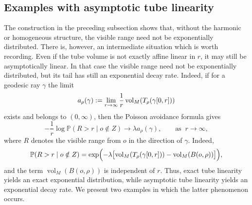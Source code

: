 \documentclass[11pt,a4paper]{article}
\theoremstyle{plain}
\theoremstyle{definition}
\theoremstyle{remark}
\newcommand{\vol}{\mathop{\mathrm{vol}}\nolimits}
\def\PP{\mathbb{P}}
\begin{document}
\subsection{Examples with asymptotic tube linearity}

The construction in the preceding subsection shows that, without the harmonic or homogeneous structure, the visible range need not be exponentially distributed. There is, however, an intermediate situation which is worth recording. Even if the tube volume is not exactly affine linear in \(r\), it may still be asymptotically linear. In that case the visible range need not be exponentially distributed, but its tail has still an exponential decay rate. Indeed, if for a geodesic ray \(\gamma\) the limit
\[
a_\rho(\gamma)
:=
\lim_{r\to\infty}
{1\over r}\vol_M(T_\rho(\gamma[0,r]))
\]
exists and belongs to \((0,\infty)\), then the Poisson avoidance formula gives
\[
-\frac{1}{r}\log \PP(R>r\mid o\notin Z)
\to
\lambda a_\rho(\gamma),
\qquad\text{as}\;\; r\to\infty,
\]
where \(R\) denotes the visible range from \(o\) in the direction of \(\gamma\). Indeed,
\[
\PP(R>r\mid o\notin Z)
=
\exp\Bigl(
-\lambda\bigl[
\vol_M(T_\rho(\gamma[0,r]))
-
\vol_M(B(o,\rho))
\bigr]
\Bigr),
\]
and the term \(\vol_M(B(o,\rho))\) is independent of \(r\). Thus, exact tube
linearity yields an exact exponential distribution, while asymptotic tube
linearity yields an exponential decay rate. We present two  examples in which the latter phenomenon occurs.
\end{document}
